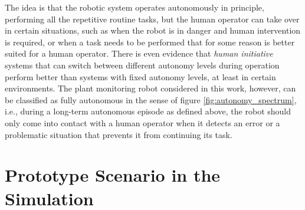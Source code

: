 \documentclass[english, master, utf8]{base/thesis_KBS}
\begin{document}
The idea is that the robotic system operates autonomously in principle, performing all the repetitive routine tasks, but the human operator can take over in certain situations,
such as when the robot is in danger and human intervention is required, or when a task needs to be performed that for some reason is better suited for a human operator.
\cite{Kortenkamp:2009} There is even evidence that \textit{human initiative} systems that can switch between different autonomy levels during operation perform better than
systems with fixed autonomy levels, at least in certain environments. \cite{Chiou:2021}
The plant monitoring robot considered in this work, however, can be classified as fully autonomous in the sense of figure \ref{fig:autonomy_spectrum}, 
i.e., during a long-term autonomous episode as defined above, the robot should only come into contact with a human operator when it detects an error or a problematic situation
that prevents it from continuing its task.

\section{Prototype Scenario in the Simulation}
\label{sec:prototype_scenario}
\end{document}
